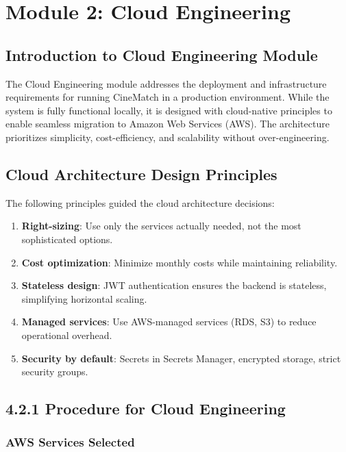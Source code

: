 \documentclass[12pt,a4paper]{report}
\begin{document}
\chapter{Module 2: Cloud Engineering}

\section{Introduction to Cloud Engineering Module}

The Cloud Engineering module addresses the deployment and infrastructure requirements for running CineMatch in a production environment. While the system is fully functional locally, it is designed with cloud-native principles to enable seamless migration to Amazon Web Services (AWS). The architecture prioritizes simplicity, cost-efficiency, and scalability without over-engineering.

\section{Cloud Architecture Design Principles}

The following principles guided the cloud architecture decisions:

\begin{enumerate}
    \item \textbf{Right-sizing}: Use only the services actually needed, not the most sophisticated options.
    \item \textbf{Cost optimization}: Minimize monthly costs while maintaining reliability.
    \item \textbf{Stateless design}: JWT authentication ensures the backend is stateless, simplifying horizontal scaling.
    \item \textbf{Managed services}: Use AWS-managed services (RDS, S3) to reduce operational overhead.
    \item \textbf{Security by default}: Secrets in Secrets Manager, encrypted storage, strict security groups.
\end{enumerate}

\section{4.2.1 Procedure for Cloud Engineering}

\subsection{AWS Services Selected}
\end{document}
